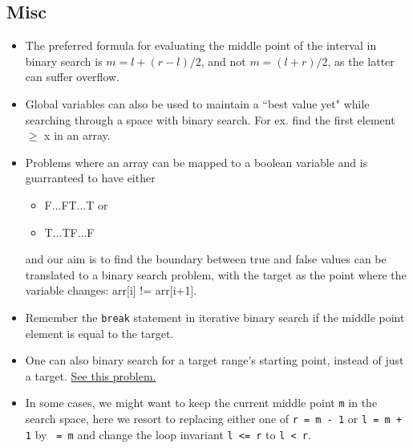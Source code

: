 \documentclass{report}
\newcommand*{\algodis}[4]{
    \textbf{#1:} #2\\%
    \textbf{Time:} #3 \\%
    \textbf{Space:} #4
}
\begin{document}
\subsection*{Misc}
\begin{itemize}
    \item The preferred formula for evaluating the middle point of
    the interval in binary search is
    $m = l + (r-l)/2$, and not
    $m = (l+r)/2$, as the latter can suffer overflow.
    \item Global variables can also be used to maintain a ``best value yet" while searching through a space with binary search. For ex. find the first element $\geq$ x in an array.
    \item Problems where an array can be mapped to a boolean variable and is guarranteed to have either
    \begin{itemize}
        \item F...FT...T or
        \item T...TF...F
    \end{itemize}
    and our aim is to find the boundary between true and false
    values can be translated to a binary search problem, with 
    the target as the point where the variable changes:
    arr[i] != arr[i+1].
    \item Remember the \texttt{break} statement in iterative binary search if the middle point element is equal to the target.
    \item One can also binary search for a target range's starting point, instead of just a target. \href{https://leetcode.com/problems/find-k-closest-elements/}{See this problem.}
    \item In some cases, we might want to keep the current middle point \texttt{m} in the search space,
    here we resort to replacing either one of \texttt{r = m - 1} or \texttt{l = m + 1} by \texttt{ = m}
    and change the loop invariant \texttt{l <= r} to \texttt{l < r}. 
\end{itemize}
\end{document}

